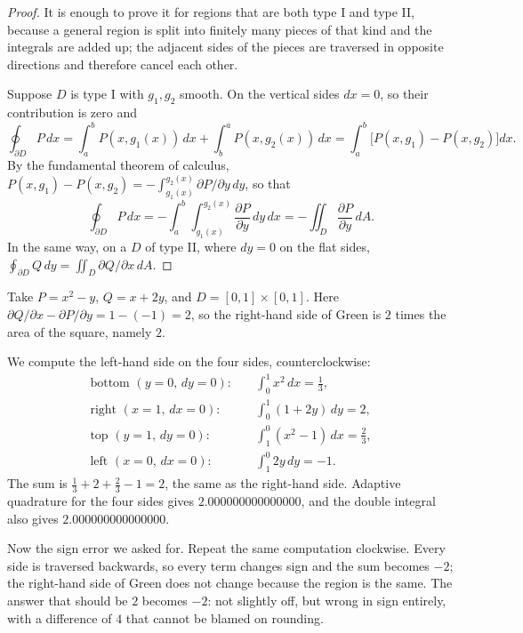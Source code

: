 \begin{proof}
It is enough to prove it for regions that are both type I and type II, because a general
region is split into finitely many pieces of that kind and the integrals are
added up; the adjacent sides of the pieces are traversed in opposite directions and therefore
cancel each other.

Suppose $D$ is type I with $g_{1},g_{2}$ smooth. On the vertical sides $dx=0$,
so their contribution is zero and
\[
\oint_{\partial D}P\,dx=\int_{a}^{b}P(x,g_{1}(x))\,dx+\int_{b}^{a}P(x,g_{2}(x))\,dx
=\int_{a}^{b}\bigl[P(x,g_{1})-P(x,g_{2})\bigr]dx .
\]
By the fundamental theorem of calculus,
$P(x,g_{1})-P(x,g_{2})=-\int_{g_{1}(x)}^{g_{2}(x)}\partial P/\partial y\,dy$,
so that
\[
\oint_{\partial D}P\,dx=-\int_{a}^{b}\!\!\int_{g_{1}(x)}^{g_{2}(x)}
\frac{\partial P}{\partial y}\,dy\,dx=-\iint_{D}\frac{\partial P}{\partial y}\,dA .
\]
In the same way, on a $D$ of type II, where $dy=0$ on the flat sides,
$\oint_{\partial D}Q\,dy=\iint_{D}\partial Q/\partial x\,dA$.
\end{proof}

\begin{contoh}
Take $P=x^{2}-y$, $Q=x+2y$, and $D=[0,1]\times[0,1]$. Here $\partial
Q/\partial x-\partial P/\partial y=1-(-1)=2$, so the right-hand side of Green is
$2$ times the area of the square, namely $2$.

We compute the left-hand side on the four sides, counterclockwise:
\begin{align*}
\text{bottom }(y=0,\,dy=0):&\quad \int_{0}^{1}x^{2}\,dx=\tfrac13 ,\\
\text{right }(x=1,\,dx=0):&\quad \int_{0}^{1}(1+2y)\,dy=2 ,\\
\text{top }(y=1,\,dy=0):&\quad \int_{1}^{0}(x^{2}-1)\,dx=\tfrac23 ,\\
\text{left }(x=0,\,dx=0):&\quad \int_{1}^{0}2y\,dy=-1 .
\end{align*}
The sum is $\tfrac13+2+\tfrac23-1=2$, the same as the right-hand side. Adaptive quadrature
for the four sides gives $2.000000000000000$, and the double integral also gives
$2.000000000000000$.
\end{contoh}

Now the sign error we asked for. Repeat the same computation clockwise. Every side is traversed
backwards, so every term changes sign and
the sum becomes $-2$; the right-hand side of Green does not change because the region is the same.
The answer that should be $2$ becomes $-2$: not slightly off, but wrong in
sign entirely, with a difference of $4$ that cannot be blamed on
rounding.

